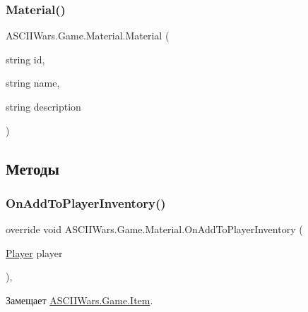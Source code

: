 \subsubsection{\texorpdfstring{Material()}{Material()}}
{\footnotesize\ttfamily A\+S\+C\+I\+I\+Wars.\+Game.\+Material.\+Material (\begin{DoxyParamCaption}\item[{string}]{id,  }\item[{string}]{name,  }\item[{string}]{description }\end{DoxyParamCaption})\hspace{0.3cm}{\ttfamily [inline]}}



\subsection{Методы}
\hypertarget{class_a_s_c_i_i_wars_1_1_game_1_1_material_afedb9d9b8b22782e40371b6cac37d27e}{}\label{class_a_s_c_i_i_wars_1_1_game_1_1_material_afedb9d9b8b22782e40371b6cac37d27e} 
\subsubsection{\texorpdfstring{On\+Add\+To\+Player\+Inventory()}{OnAddToPlayerInventory()}}
{\footnotesize\ttfamily override void A\+S\+C\+I\+I\+Wars.\+Game.\+Material.\+On\+Add\+To\+Player\+Inventory (\begin{DoxyParamCaption}\item[{\hyperlink{class_a_s_c_i_i_wars_1_1_game_1_1_player}{Player}}]{player }\end{DoxyParamCaption})\hspace{0.3cm}{\ttfamily [inline]}, {\ttfamily [virtual]}}



Замещает \hyperlink{class_a_s_c_i_i_wars_1_1_game_1_1_item_aec0355b7a9f647ef24897b95563f70d1}{A\+S\+C\+I\+I\+Wars.\+Game.\+Item}.

\hypertarget{class_a_s_c_i_i_wars_1_1_game_1_1_material_ab8467edc48ff6af4021f550c97cbec31}{}\label{class_a_s_c_i_i_wars_1_1_game_1_1_material_ab8467edc48ff6af4021f550c97cbec31} 
